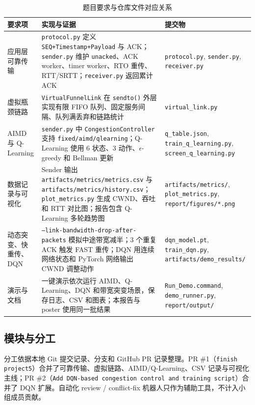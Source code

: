 \documentclass[a4paper, 11pt]{article}
\begin{document}
\begin{table}[H]
\centering
\caption{题目要求与仓库文件对应关系}
\footnotesize
\begin{tabularx}{\textwidth}{l X X}
\toprule
\textbf{要求项} & \textbf{实现与证据} & \textbf{提交物} \\
\midrule
应用层可靠传输 & \texttt{protocol.py} 定义 \texttt{SEQ+Timestamp+Payload} 与 ACK；\texttt{sender.py} 维护 \texttt{unacked}、ACK worker、timer worker、RTO 重传、RTT/SRTT；\texttt{receiver.py} 返回累计 ACK & \texttt{protocol.py}, \texttt{sender.py}, \texttt{receiver.py} \\
虚拟瓶颈链路 & \texttt{VirtualFunnelLink} 在 \texttt{sendto()} 外层实现有限 FIFO 队列、固定服务间隔、队列满丢弃和链路统计 & \texttt{virtual\_link.py} \\
AIMD 与 Q-Learning & \texttt{sender.py} 中 \texttt{CongestionController} 支持 \texttt{fixed/aimd/qlearning}；Q-Learning 使用 6 状态、3 动作、\(\epsilon\)-greedy 和 Bellman 更新 & \texttt{q\_table.json}, \texttt{train\_q\_learning.py}, \texttt{screen\_q\_learning.py} \\
数据记录与可视化 & Sender 输出 \texttt{artifacts/metrics/metrics.csv} 与 \texttt{artifacts/metrics/history.csv}；\texttt{plot\_metrics.py} 生成 CWND、吞吐和 RTT 对比图；报告包含 Q-Learning 多轮趋势图 & \texttt{artifacts/metrics/}, \texttt{plot\_metrics.py}, \texttt{report/figures/*.png} \\
动态突变、快重传、DQN & \texttt{--link-bandwidth-drop-after-packets} 模拟中途带宽减半；3 个重复 ACK 触发 FAST 重传；DQN 用连续网络状态和 PyTorch 网络输出 CWND 调整动作 & \texttt{dqn\_model.pt}, \texttt{train\_dqn.py}, \texttt{artifacts/demo\_results/} \\
演示与文档 & 一键演示依次运行 AIMD、Q-Learning、DQN 和带宽突变场景，保存日志、CSV 和图表；本报告与 poster 使用同一批结果 & \texttt{Run\_Demo.command}, \texttt{demo\_runner.py}, \texttt{report/output/} \\
\bottomrule
\end{tabularx}
\end{table}

\subsection{模块与分工}
分工依据本地 Git 提交记录、分支和 GitHub PR 记录整理。PR \#1（\texttt{finish project5}）合并了可靠传输、虚拟链路、AIMD/Q-Learning、CSV 记录与可视化主线；PR \#2（\texttt{Add DQN-based congestion control and training script}）合并了 DQN 扩展。自动化 review / conflict-fix 机器人只作为辅助工具，不计入小组成员贡献。
\end{document}

